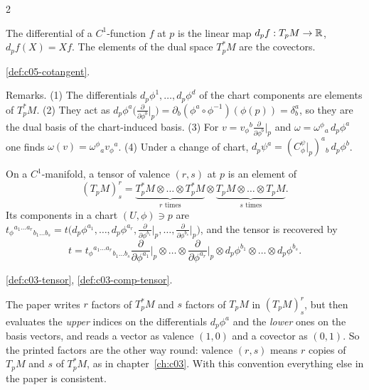 \begin{paracol}{2}
\begin{definition}\label{def:c29-diff}
The differential of a $C^1$-function $f$ at $p$ is the linear map $d_pf:T_pM\to\mathbb{R}$, $d_pf(X)=Xf$. The elements of the dual space $T^*_pM$ are the covectors.
\end{definition}
\begin{recall}
\cref{def:c05-cotangent}.
\end{recall}

Remarks. (1) The differentials $d_p\phi^1,\dots,d_p\phi^d$ of the chart components are elements of $T^*_pM$. (2) They act as $d_p\phi^a\bigl(\frac{\partial}{\partial\phi^b}\big|_p\bigr)=\partial_b(\phi^a\circ\phi^{-1})(\phi(p))=\delta^a_b$, so they are the dual basis of the chart-induced basis. (3) For $v=v_\phi{}^b\frac{\partial}{\partial\phi^b}\big|_p$ and $\omega=\omega^\phi{}_a\,d_p\phi^a$ one finds $\omega(v)=\omega^\phi{}_av_\phi{}^a$. (4) Under a change of chart, $d_p\psi^a=(C^\psi_\phi|_p)^a{}_b\,d_p\phi^b$.

\begin{definition}\label{def:c29-tensor}
On a $C^1$-manifold, a tensor of valence $(r,s)$ at $p$ is an element of
\[
  (T_pM)^r_s=\underbrace{T^*_pM\otimes\dots\otimes T^*_pM}_{r\text{ times}}\otimes\underbrace{T_pM\otimes\dots\otimes T_pM}_{s\text{ times}}.
\]
Its components in a chart $(U,\phi)\ni p$ are $t_\phi{}^{a_1\dots a_r}{}_{b_1\dots b_s}=t\bigl(d_p\phi^{a_1},\dots,d_p\phi^{a_r},\frac{\partial}{\partial\phi^{b_1}}\big|_p,\dots,\frac{\partial}{\partial\phi^{b_s}}\big|_p\bigr)$, and the tensor is recovered by
\[
  t=t_\phi{}^{a_1\dots a_r}{}_{b_1\dots b_s}\frac{\partial}{\partial\phi^{a_1}}\Big|_p\otimes\dots\otimes\frac{\partial}{\partial\phi^{a_r}}\Big|_p\otimes d_p\phi^{b_1}\otimes\dots\otimes d_p\phi^{b_s}.
\]
\end{definition}
\begin{recall}[Tensors]
\cref{def:c03-tensor}, \cref{def:c03-comp-tensor}.
\end{recall}
\begin{coursenote}
The paper writes $r$ factors of $T^*_pM$ and $s$ factors of $T_pM$ in $(T_pM)^r_s$, but then evaluates the \emph{upper} indices on the differentials $d_p\phi^a$ and the \emph{lower} ones on the basis vectors, and reads a vector as valence $(1,0)$ and a covector as $(0,1)$. So the printed factors are the other way round: valence $(r,s)$ means $r$ copies of $T_pM$ and $s$ of $T^*_pM$, as in chapter~\ref{ch:c03}. With this convention everything else in the paper is consistent.
\end{coursenote}


\end{paracol}
